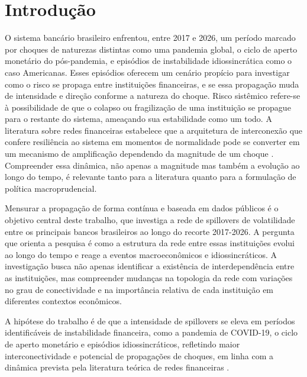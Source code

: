 \documentclass[12pt, a4paper, oneside, english, brazil]{abntex2}
\begin{document}
\chapter{Introdução}
\label{cap:introducao}

O sistema bancário brasileiro enfrentou, entre 2017 e 2026, um período marcado por choques
de naturezas distintas como uma pandemia global, o ciclo de aperto monetário do pós-pandemia,
e episódios de instabilidade idiossincrática como o caso Americanas. Esses episódios oferecem
um cenário propício para investigar como o risco se propaga entre instituições financeiras,
e se essa propagação muda de intensidade e direção conforme a natureza do choque. Risco sistêmico refere-se à possibilidade de que o colapso ou fragilização de uma instituição
se propague para o restante do sistema, ameaçando sua estabilidade como um todo. A literatura 
sobre redes financeiras estabelece que a arquitetura de interconexão que confere resiliência 
ao sistema em momentos de normalidade pode se converter em um mecanismo de amplificação dependendo
da magnitude de um choque \parencite{acemoglu2015}. Compreender
essa dinâmica, não apenas a magnitude mas também a evolução ao longo do tempo, é relevante 
tanto para a literatura quanto para a formulação de política macroprudencial. 

Mensurar a propagação de forma contínua e baseada em dados públicos é o objetivo central deste
trabalho, que investiga a rede de spillovers de volatilidade entre os principais bancos 
brasileiros ao longo do recorte 2017-2026. A pergunta que orienta a pesquisa é como a estrutura 
da rede entre essas instituições evolui ao longo do tempo e reage a eventos macroeconômicos
e idiossincráticos. A investigação busca não apenas identificar a existência de interdependência
entre as instituições, mas compreender mudanças na topologia da rede com variações no grau de 
conectividade e na importância relativa de cada instituição em diferentes contextos econômicos.

A hipótese do trabalho é de que a intensidade de spillovers se eleva em períodos identificáveis
de instabilidade financeira, como a pandemia de COVID-19, o ciclo de aperto monetário e episódios
idiossincráticos, refletindo maior interconectividade e potencial de propagações de choques, 
em linha com a dinâmica prevista pela literatura teórica de redes financeiras \parencite{acemoglu2015, allen2000}.
\end{document}
